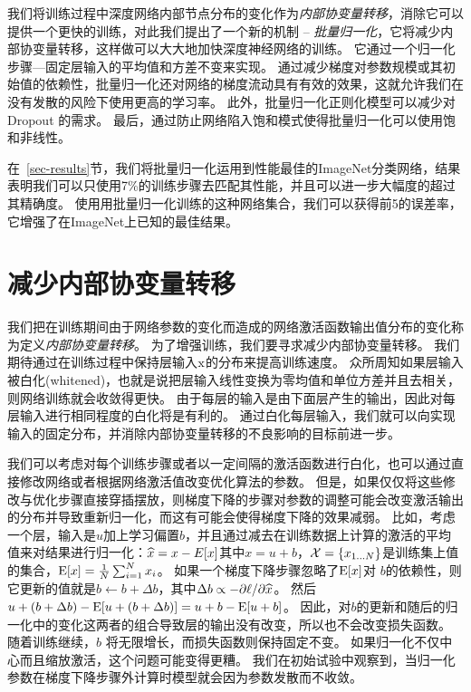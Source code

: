 \documentclass[twocolumn]{article}
\begin{document}
我们将训练过程中深度网络内部节点分布的变化作为{\em 内部协变量转移}，消除它可以提供一个更快的训练，对此我们提出了一个新的机制 -- {\em 批量归一化}，它将减少内部协变量转移，这样做可以大大地加快深度神经网络的训练。
它通过一个归一化步骤—固定层输入的平均值和方差不变来实现。
通过减少梯度对参数规模或其初始值的依赖性，批量归一化还对网络的梯度流动具有有效的效果，这就允许我们在没有发散的风险下使用更高的学习率。
此外，批量归一化正则化模型可以减少对Dropout \cite{dropout}的需求。
最后，通过防止网络陷入饱和模式使得批量归一化可以使用饱和非线性。

在~\ref{sec-results}节，我们将批量归一化运用到性能最佳的ImageNet分类网络，结果表明我们可以只使用7\%的训练步骤去匹配其性能，并且可以进一步大幅度的超过其精确度。
使用用批量归一化训练的这种网络集合，我们可以获得前5的误差率，它增强了在ImageNet上已知的最佳结果。

\section{减少内部\mbox{协变量}转移}

我们把在训练期间由于网络参数的变化而造成的网络激活函数输出值分布的变化称为定义{\em 内部协变量转移}。
为了增强训练，我们要寻求减少内部协变量转移。
我们期待通过在训练过程中保持层输入$\mathrm{x}$的分布来提高训练速度。
众所周知\cite{lecun-backprop,  loglinear-training}如果层输入被白化(whitened)，也就是说把层输入线性变换为零均值和单位方差并且去相关，则网络训练就会收敛得更快。
由于每层的输入是由下面层产生的输出，因此对每层输入进行相同程度的白化将是有利的。
通过白化每层输入，我们就可以向实现输入的固定分布，并消除内部协变量转移的不良影响的目标前进一步。

我们可以考虑对每个训练步骤或者以一定间隔的激活函数进行白化，也可以通过直接修改网络或者根据网络激活值改变优化算法的参数\cite{mean-normalized-sgd, raiko, povey,  desjardins}。
但是，如果仅仅将这些修改与优化步骤直接穿插摆放，则梯度下降的步骤对参数的调整可能会改变激活输出的分布并导致重新归一化，而这有可能会使得梯度下降的效果减弱。
比如，考虑一个层，输入是$u$加上学习偏置$b$，并且通过减去在训练数据上计算的激活的平均值来对结果进行归一化：$\widehat{x}=x - E[x]$其中$x = u+b$，$\mathcal{X}=\{x_{1\ldots N}\}$是训练集上值的集合，$ \text{E}[x] = \frac{1}{N}\sum_{i=1}^Nx_i$。
如果一个梯度下降步骤忽略了$\text{E}[x]$对 $b$的依赖性，则它更新的值就是$b\leftarrow b+\Delta b$，其中$\Delta b\propto -\partial{\ell}/\partial{\widehat{x}}$。
然后$u+(b+\Delta b) - \text{E}[u+(b+\Delta b)] = u+b-\text{E}[u+b]$。
因此，对$b$的更新和随后的归一化中的变化这两者的组合导致层的输出没有改变，所以也不会改变损失函数。
随着训练继续，$b$ 将无限增长，而损失函数则保持固定不变。
如果归一化不仅中心而且缩放激活，这个问题可能变得更糟。
我们在初始试验中观察到，当归一化参数在梯度下降步骤外计算时模型就会因为参数发散而不收敛。
\end{document}
